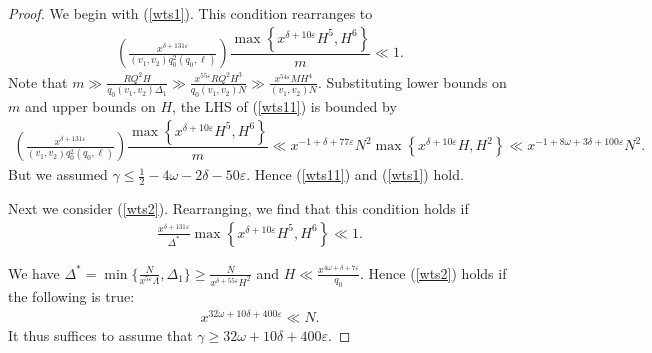 \documentclass{amsart}
\numberwithin{equation}{section}
\begin{document}
\begin{proof}
\vspace{3mm}
We begin with (\ref{wts1}). This condition rearranges to
\begin{align} \label{wts11}
\left( \frac{ x^{\delta+131\varepsilon}}{(v_1,v_2)q_0^2(q_0,\ell)  }\right) \dfrac{\max\left\{x^{\delta+10\varepsilon}H^5,H^6\right\}}{ m}  \ll  1. 
\end{align}
Note that $m \gg \tfrac{RQ^2H}{q_0 (v_1,v_2)\Delta_1} \gg \tfrac{x^{55\varepsilon}RQ^2H^3}{q_0(v_1,v_2)N} \gg \tfrac{x^{54\varepsilon}  M H^4}{(v_1,v_2)N}$. 
Substituting lower bounds on $m$ and upper bounds on  $H$, the LHS of (\ref{wts11}) is bounded  by 
\begin{align*} 
\left( \frac{ x^{\delta+131\varepsilon}}{(v_1,v_2)q_0^2(q_0,\ell)  }\right) \dfrac{\max\left\{x^{\delta+10\varepsilon}H^5,H^6\right\}}{ m}  \ll   x^{-1+\delta+77\varepsilon}N^2 \max\left\{x^{\delta+10\varepsilon}H,H^2\right\} \ll  x^{-1+8\omega+3\delta+100\varepsilon}  N^2. 
\end{align*}
But we assumed $\gamma \leq \frac{1}{2}-4\omega-2\delta-50\varepsilon$. Hence (\ref{wts11}) and (\ref{wts1}) hold. 

\vspace{3mm}  
Next we consider (\ref{wts2}). Rearranging, we find that this condition holds if
\begin{align*}
\frac{x^{\delta+131\varepsilon}}{\Delta^*}\max\left\{x^{\delta+10\varepsilon}H^5,H^6\right\} \ll  1.
\end{align*}

 We have $\Delta^*=\min\{\frac{N}{x^{5\varepsilon}\Lambda }, \Delta_1\} \geq \frac{N}{x^{\delta+55\varepsilon}H^2}$ and $H \ll \tfrac{x^{4\omega+\delta+7\varepsilon}}{q_0}$. Hence (\ref{wts2}) holds if the following is true: 
\begin{align*}
x^{32\omega+10\delta+400\varepsilon}  \ll N.
\end{align*}
It thus suffices to assume that $\gamma \geq 32\omega + 10 \delta +400\varepsilon$. 


\end{proof}
\end{document}
